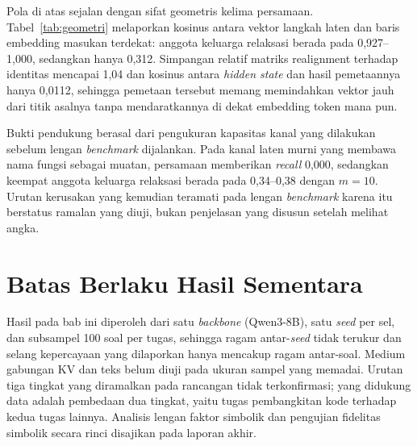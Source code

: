 

Pola di atas sejalan dengan sifat geometris kelima persamaan.
Tabel~\ref{tab:geometri} melaporkan kosinus antara vektor langkah laten dan
baris embedding masukan terdekat: anggota keluarga relaksasi berada pada
0,927--1,000, sedangkan  hanya 0,312. Simpangan relatif matriks
realignment terhadap identitas mencapai 1,04 dan kosinus antara \textit{hidden
state} dan hasil pemetaannya hanya 0,0112, sehingga pemetaan tersebut memang
memindahkan vektor jauh dari titik asalnya tanpa mendaratkannya di dekat
embedding token mana pun.

Bukti pendukung berasal dari pengukuran kapasitas kanal yang dilakukan sebelum
lengan \textit{benchmark} dijalankan. Pada kanal laten murni yang membawa nama
fungsi sebagai muatan, persamaan  memberikan \textit{recall} 0,000,
sedangkan keempat anggota keluarga relaksasi berada pada 0,34--0,38 dengan
$m=10$. Urutan kerusakan yang kemudian teramati pada lengan \textit{benchmark}
karena itu berstatus ramalan yang diuji, bukan penjelasan yang disusun setelah
melihat angka.

\section{Batas Berlaku Hasil Sementara}

Hasil pada bab ini diperoleh dari satu \textit{backbone} (Qwen3-8B), satu
\textit{seed} per sel, dan subsampel 100 soal per tugas, sehingga ragam
antar-\textit{seed} tidak terukur dan selang kepercayaan yang dilaporkan hanya
mencakup ragam antar-soal. Medium gabungan KV dan teks belum diuji pada ukuran
sampel yang memadai. Urutan tiga tingkat yang diramalkan pada rancangan tidak
terkonfirmasi; yang didukung data adalah pembedaan dua tingkat, yaitu tugas
pembangkitan kode terhadap kedua tugas lainnya. Analisis lengan faktor simbolik
dan pengujian fidelitas simbolik secara rinci disajikan pada laporan akhir.
